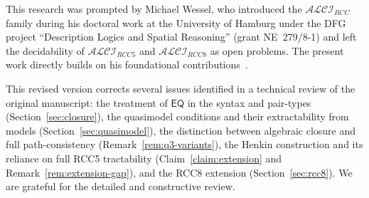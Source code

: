 \documentclass[a4paper,11pt]{article}
\theoremstyle{definition}
\newcommand{\ALCIRCC}[1]{\ensuremath{\mathcal{ALCI}_{\mathit{RCC#1}}}}
\newcommand{\EQ}{\ensuremath{\mathsf{EQ}}}
\begin{document}
This research was prompted by Michael Wessel, who introduced the
$\ALCIRCC{}$ family during his doctoral work at the University of
Hamburg under the DFG project ``Description Logics and Spatial
Reasoning'' (grant NE~279/8-1) and left the decidability of
$\ALCIRCC{5}$ and $\ALCIRCC{8}$ as open problems.  The present
work directly builds on his foundational contributions~\cite{Wessel2003,Wessel2000}.

This revised version corrects several issues identified in a technical
review of the original manuscript: the treatment of $\EQ$ in the
syntax and pair-types (Section~\ref{sec:closure}), the quasimodel
conditions and their extractability from models
(Section~\ref{sec:quasimodel}), the distinction between algebraic
closure and full path-consistency
(Remark~\ref{rem:q3-variants}), the Henkin construction and its
reliance on full RCC5 tractability
(Claim~\ref{claim:extension} and Remark~\ref{rem:extension-gap}),
and the RCC8 extension (Section~\ref{sec:rcc8}).  We are grateful for
the detailed and constructive review.
\end{document}
